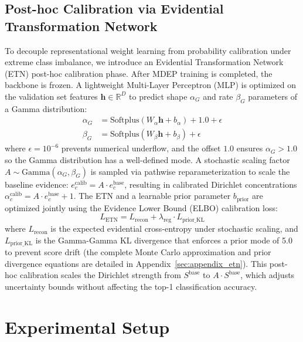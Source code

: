 \documentclass[letterpaper]{article} %
\begin{document}
\subsection{Post-hoc Calibration via Evidential Transformation Network}
To decouple representational weight learning from probability calibration under extreme class imbalance, we introduce an Evidential Transformation Network (ETN) post-hoc calibration phase. After MDEP training is completed, the backbone is frozen. A lightweight Multi-Layer Perceptron (MLP) is optimized on the validation set features $\bm{h} \in \mathbb{R}^D$ to predict shape $\alpha_G$ and rate $\beta_G$ parameters of a Gamma distribution:
\begin{align}
    \alpha_G &= \text{Softplus}(W_{\alpha} \bm{h} + b_{\alpha}) + 1.0 + \epsilon \\
    \beta_G &= \text{Softplus}(W_{\beta} \bm{h} + b_{\beta}) + \epsilon
\end{align}
where $\epsilon = 10^{-6}$ prevents numerical underflow, and the offset $1.0$ ensures $\alpha_G > 1.0$ so the Gamma distribution has a well-defined mode. A stochastic scaling factor $A \sim \text{Gamma}(\alpha_G, \beta_G)$ is sampled via pathwise reparameterization to scale the baseline evidence: $e^{\text{calib}}_c = A \cdot e^{\text{base}}_c$, resulting in calibrated Dirichlet concentrations $\alpha^{\text{calib}}_c = A \cdot e^{\text{base}}_c + 1$.
The ETN and a learnable prior parameter $b_{\text{prior}}$ are optimized jointly using the Evidence Lower Bound (ELBO) calibration loss:
\begin{equation}\label{eq:etn_loss_main}
    L_{\text{ETN}} = L_{\text{recon}} + \lambda_{\text{reg}} \cdot L_{\text{prior\_KL}}
\end{equation}
where $L_{\text{recon}}$ is the expected evidential cross-entropy under stochastic scaling, and $L_{\text{prior\_KL}}$ is the Gamma-Gamma KL divergence that enforces a prior mode of 5.0 to prevent score drift (the complete Monte Carlo approximation and prior divergence equations are detailed in Appendix~\ref{sec:appendix_etn}). This post-hoc calibration scales the Dirichlet strength from $S^{\text{base}}$ to $A \cdot S^{\text{base}}$, which adjusts uncertainty bounds without affecting the top-1 classification accuracy.

\section{Experimental Setup}\label{sec:experiment}
\end{document}
